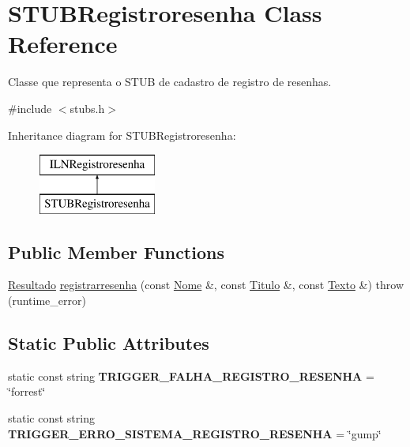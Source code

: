 \hypertarget{classSTUBRegistroresenha}{}\section{S\+T\+U\+B\+Registroresenha Class Reference}
\label{classSTUBRegistroresenha}


Classe que representa o S\+T\+UB de cadastro de registro de resenhas.  




{\ttfamily \#include $<$stubs.\+h$>$}

Inheritance diagram for S\+T\+U\+B\+Registroresenha\+:\begin{figure}[H]
\begin{center}
\leavevmode
\includegraphics[height=2.000000cm]{classSTUBRegistroresenha}
\end{center}
\end{figure}
\subsection*{Public Member Functions}
\begin{DoxyCompactItemize}
\item 
\hyperlink{classResultado}{Resultado} \hyperlink{classSTUBRegistroresenha_a98762ff953cb017d00a225a0772b6394}{registrarresenha} (const \hyperlink{classNome}{Nome} \&, const \hyperlink{classTitulo}{Titulo} \&, const \hyperlink{classTexto}{Texto} \&)  throw (runtime\+\_\+error)
\end{DoxyCompactItemize}
\subsection*{Static Public Attributes}
\begin{DoxyCompactItemize}
\item 
\mbox{\label{classSTUBRegistroresenha_a94328e1c8f7e2e0e6d6483364e2ab68a}} 
static const string {\bfseries T\+R\+I\+G\+G\+E\+R\+\_\+\+F\+A\+L\+H\+A\+\_\+\+R\+E\+G\+I\+S\+T\+R\+O\+\_\+\+R\+E\+S\+E\+N\+HA} = \char`\"{}forrest\char`\"{}
\item 
\mbox{\label{classSTUBRegistroresenha_aaa64d45e5b6a55ec5554d3b764d04e74}} 
static const string {\bfseries T\+R\+I\+G\+G\+E\+R\+\_\+\+E\+R\+R\+O\+\_\+\+S\+I\+S\+T\+E\+M\+A\+\_\+\+R\+E\+G\+I\+S\+T\+R\+O\+\_\+\+R\+E\+S\+E\+N\+HA} = \char`\"{}gump\char`\"{}
\end{DoxyCompactItemize}


